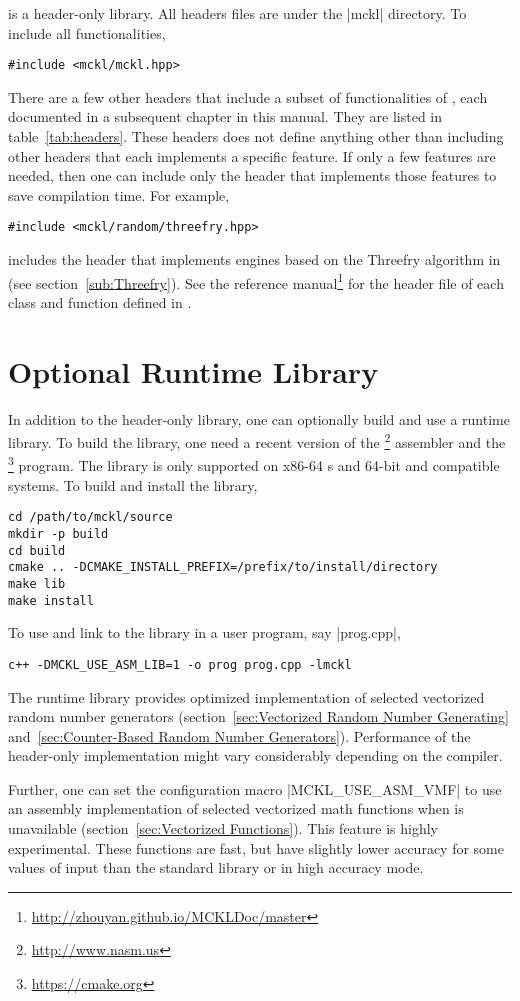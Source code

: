 \mckl is a header-only library. All headers files are under the |mckl|
directory. To include all functionalities,
\begin{verbatim}
#include <mckl/mckl.hpp>
\end{verbatim}
There are a few other headers that include a subset of functionalities of
\mckl, each documented in a subsequent chapter in this manual. They are listed
in table~\ref{tab:headers}. These headers does not define anything other than
including other headers that each implements a specific feature. If only a few
features are needed, then one can include only the header that implements those
features to save compilation time. For example,
\begin{verbatim}
#include <mckl/random/threefry.hpp>
\end{verbatim}
includes the header that implements \rng engines based on the Threefry
algorithm in~\cite{Salmon:2011um} (see section~\ref{sub:Threefry}). See the
reference manual\footnote{\url{http://zhouyan.github.io/MCKLDoc/master}} for
the header file of each class and function defined in \mckl.

\section{Optional Runtime Library}
\label{sec:Optional Runtime Library}

In addition to the header-only library, one can optionally build and use a
runtime library. To build the library, one need a recent version of the
\nasm\footnote{\url{http://www.nasm.us}} assembler and the
\cmake\footnote{\url{https://cmake.org}} program. The library is only supported
on x86-64 \cpu{}s and 64-bit \unix and compatible systems. To build and install
the library,
\begin{verbatim}
cd /path/to/mckl/source
mkdir -p build
cd build
cmake .. -DCMAKE_INSTALL_PREFIX=/prefix/to/install/directory
make lib
make install
\end{verbatim}
To use and link to the library in a user program, say |prog.cpp|,
\begin{verbatim}
c++ -DMCKL_USE_ASM_LIB=1 -o prog prog.cpp -lmckl
\end{verbatim}

The runtime library provides optimized implementation of selected vectorized
random number generators (section~\ref{sec:Vectorized Random Number Generating}
and~\ref{sec:Counter-Based Random Number Generators}). Performance of the
header-only implementation might vary considerably depending on the compiler.

Further, one can set the configuration macro |MCKL_USE_ASM_VMF| to use an
assembly implementation of selected vectorized math functions when \mkl \vml is
unavailable (section~\ref{sec:Vectorized Functions}). This feature is highly
experimental. These functions are fast, but have slightly lower accuracy for
some values of input than the standard library or \mkl \vml in high accuracy
mode.
